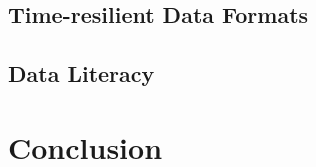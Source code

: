 \documentclass[runningheads,a4paper]{llncs}
\begin{document}
\subsection{Time-resilient Data Formats}

\subsection{Data Literacy}

\section{Conclusion}












\end{document}
